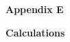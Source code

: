 \documentclass[12pt]{article}
\begin{document}
\vspace{\baselineskip}

\vspace{\baselineskip}

\vspace{\baselineskip}

\vspace{\baselineskip}

\vspace{\baselineskip}

\vspace{\baselineskip}

\vspace{\baselineskip}

\vspace{\baselineskip}

\vspace{\baselineskip}

\vspace{\baselineskip}

\vspace{\baselineskip}

\vspace{\baselineskip}

\vspace{\baselineskip}

\vspace{\baselineskip}

\vspace{\baselineskip}

\vspace{\baselineskip}
\begin{Center}
{\fontsize{8pt}{9.6pt}\par}
\end{Center}\par


\vspace{\baselineskip}
\begin{adjustwidth}{0.0in}{0.01in}
\begin{Center}
{\fontsize{11pt}{13.2pt}\selectfont \textbf{Appendix E}\par}
\end{Center}\par

\end{adjustwidth}


\vspace{\baselineskip}
\begin{adjustwidth}{0.0in}{0.01in}
\begin{Center}
{\fontsize{11pt}{13.2pt}\selectfont \textbf{Calculations}\par}
\end{Center}\par

\end{adjustwidth}
\end{document}
